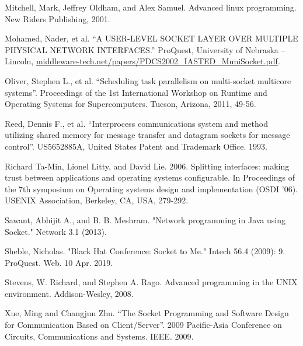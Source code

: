 \documentclass[conference, 12pt]{IEEEtran}
\begin{document}
\begin{thebibliography}{00}
Mitchell, Mark, Jeffrey Oldham, and Alex Samuel. Advanced linux programming. New Riders Publishing, 2001.
     
Mohamed, Nader, et al. “A USER-LEVEL SOCKET LAYER OVER MULTIPLE PHYSICAL NETWORK INTERFACES.” ProQuest, University of Nebraska – Lincoln, \url{middleware-tech.net/papers/PDCS2002_IASTED_MuniSocket.pdf}.
     
Oliver, Stephen L., et al. “Scheduling task parallelism on multi-socket multicore systems”. Proceedings of the 1st International Workshop on Runtime and Operating Systems for Supercomputers. Tucson, Arizona, 2011, 49-56.
     
Reed, Dennis F., et al. “Interprocess communications system and method utilizing shared memory for message transfer and datagram sockets for message control”. US5652885A, United States Patent and Trademark Office. 1993.
     
Richard Ta-Min, Lionel Litty, and David Lie. 2006. Splitting interfaces: making trust between applications and operating systems configurable. In Proceedings of the 7th symposium on Operating systems design and implementation (OSDI '06). USENIX Association, Berkeley, CA, USA, 279-292.
     
Sawant, Abhijit A., and B. B. Meshram. "Network programming in Java using Socket." Network 3.1 (2013).
     
Sheble, Nicholas. "Black Hat Conference: Socket to Me." Intech 56.4 (2009): 9. ProQuest. Web. 10 Apr. 2019.
     
Stevens, W. Richard, and Stephen A. Rago. Advanced programming in the UNIX environment. Addison-Wesley, 2008.
     
Xue, Ming and Changjun Zhu. “The Socket Programming and Software Design for Communication Based on Client/Server”. 2009 Pacific-Asia Conference on Circuits, Communications and Systems. IEEE. 2009.    
\end{thebibliography}
\end{document}
